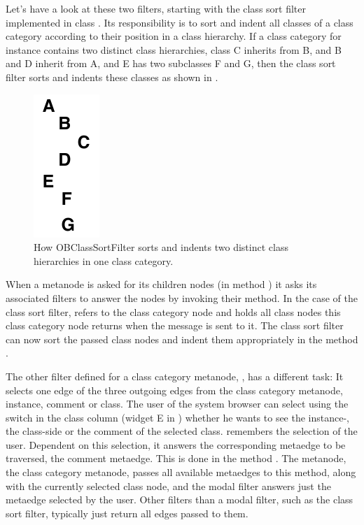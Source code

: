 \documentclass[a4paper,10pt,twoside]{book}
\begin{document}
Let's have a look at these two filters, starting with the class sort filter implemented in class . Its responsibility is to sort and indent all classes of a class category according to their position in a class hierarchy. If a class category for instance contains two distinct class hierarchies, \eg class C inherits from B, and B and D inherit from A, and E has two subclasses F and G, then the class sort filter sorts and indents these classes as shown in .

\begin{figure}[!ht]
\begin{center}
\includegraphics[scale=1]{classSortFilter.pdf}
\caption{How OBClassSortFilter sorts and indents two distinct class hierarchies in one class category.} 
\end{center}
\end{figure}

When a metanode is asked for its children nodes (in method ) it asks its associated filters to answer the nodes by invoking their  method. In the case of the class sort filter,  refers to the class category node and  holds all class nodes this class category node returns when the message  is sent to it. The class sort filter can now sort the passed class nodes and indent them appropriately in the method .

The other filter defined for a class category metanode, , has a different task: It selects one edge of the three outgoing edges from the class category metanode, \ie instance, comment or class.  The user of the system browser can select using the switch in the class column (widget E in ) whether he wants to see the instance-, the class-side or the comment of the selected class.  remembers the selection of the user. Dependent on this selection, it answers the corresponding metaedge to be traversed, \eg the comment metaedge. This is done in the method . The metanode, \ie the class category metanode, passes all available metaedges to this method, along with the currently selected class node, and the modal filter answers just the metaedge selected by the user. Other filters than a modal filter, such as the class sort filter, typically just return all edges passed to them.
\end{document}
